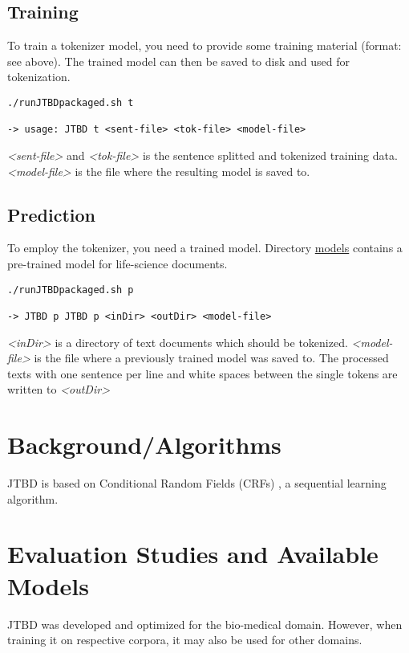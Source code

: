 \documentclass[11pt,a4paper,halfparskip]{scrartcl}
\begin{document}
\subsection{Training}

To train a tokenizer model, you need to provide some training material
(format: see above). The trained model can then be saved to disk and
used for tokenization.

\begin{verbatim}
./runJTBDpackaged.sh t

-> usage: JTBD t <sent-file> <tok-file> <model-file>
\end{verbatim}

\textit{<sent-file>} and \textit{<tok-file>} is the sentence splitted
and tokenized training data. \textit{<model-file>} is the file where
the resulting model is saved to.

\subsection{Prediction}

To employ the tokenizer, you need a trained model. Directory
\url{models} contains a pre-trained model for life-science documents.

\begin{verbatim}
./runJTBDpackaged.sh p

-> JTBD p JTBD p <inDir> <outDir> <model-file>
\end{verbatim}

\textit{<inDir>} is a directory of text documents which should be
tokenized. \textit{<model-file>} is the file where a previously
trained model was saved to. The processed texts with one sentence per
line and white spaces between the single tokens are written to
\textit{<outDir>}

\section{Background/Algorithms}
\label{sec:background}

JTBD is based on Conditional Random Fields (CRFs) \cite{lafferty01}, a
sequential learning algorithm. 

\section{Evaluation Studies and Available Models}

JTBD was developed and optimized for the bio-medical domain. However,
when training it on respective corpora, it may also be used for other
domains.
\end{document}
